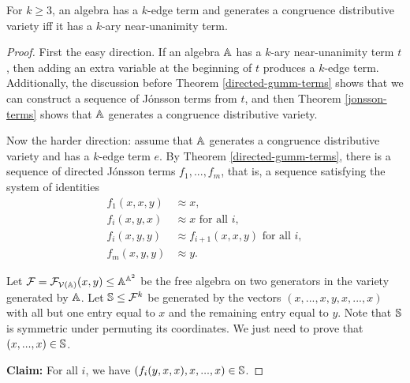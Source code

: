\documentclass[letterpaper,11pt]{article}
\begin{document}
\begin{thm}\label{cd-few-subpowers-nu} For $k \ge 3$, an algebra has a $k$-edge term and generates a congruence distributive variety iff it has a $k$-ary near-unanimity term.
\end{thm}
\begin{proof} First the easy direction. If an algebra $\mathbb{A}$ has a $k$-ary near-unanimity term $t$, then adding an extra variable at the beginning of $t$ produces a $k$-edge term. Additionally, the discussion before Theorem \ref{directed-gumm-terms} shows that we can construct a sequence of J\'onsson terms from $t$, and then Theorem \ref{jonsson-terms} shows that $\mathbb{A}$ generates a congruence distributive variety.

Now the harder direction: assume that $\mathbb{A}$ generates a congruence distributive variety and has a $k$-edge term $e$. By Theorem \ref{directed-gumm-terms}, there is a sequence of directed J\'onsson terms $f_1, ..., f_m$, that is, a sequence satisfying the system of identities
\begin{align*}
f_1(x,x,y) &\approx x,\\
f_i(x,y,x) &\approx x\text{ for all }i,\\
f_i(x,y,y) &\approx f_{i+1}(x,x,y)\text{ for all }i,\\
f_m(x,y,y) &\approx y.
\end{align*}

Let $\mathcal{F} = \mathcal{F}_{\mathcal{V}(\mathbb{A})}(x,y) \le \mathbb{A}^{\mathbb{A}^2}$ be the free algebra on two generators in the variety generated by $\mathbb{A}$. Let $\mathbb{S} \le \mathcal{F}^k$ be generated by the vectors $(x,...,x,y,x,...,x)$ with all but one entry equal to $x$ and the remaining entry equal to $y$. Note that $\mathbb{S}$ is symmetric under permuting its coordinates. We just need to prove that $(x,...,x) \in \mathbb{S}$.

{\bf Claim:} For all $i$, we have $(f_i(y,x,x),x,...,x) \in \mathbb{S}$.


\end{proof}
\end{document}
